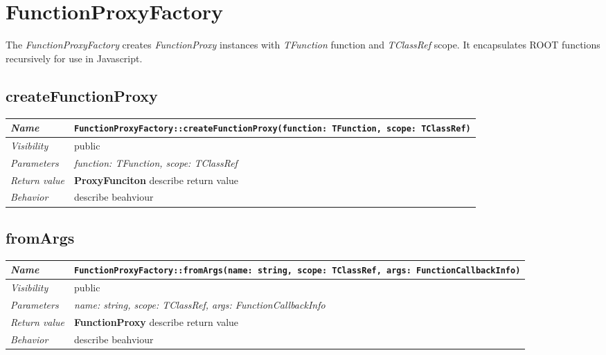 \chapter{FunctionProxyFactory}
The \textit{FunctionProxyFactory} creates \textit{FunctionProxy} instances with \textit{TFunction} function and \textit{TClassRef} scope. It encapsulates ROOT functions recursively for use in Javascript. 
\section{createFunctionProxy}
\begin{longtable}{p{3cm} @{\hskip 1cm} p{12cm}}
 \hline
\textit{Name} & \texttt{FunctionProxyFactory::createFunctionProxy(function: TFunction, scope: TClassRef)}\\
\hline
 \textit{Visibility} & public\\
\hline
\textit{Parameters} & \textit{function: TFunction, scope: TClassRef}\\
\hline
\textit{Return value} & \textbf{ ProxyFunciton} describe return value\\
  \hline
 \textit{Behavior} & describe beahviour \\
\hline
\end{longtable} \pagebreak
 \section{fromArgs}
\begin{longtable}{p{3cm} @{\hskip 1cm} p{12cm}}
 \hline
\textit{Name} & \texttt{FunctionProxyFactory::fromArgs(name: string, scope: TClassRef, args: FunctionCallbackInfo)}\\
\hline
 \textit{Visibility} & public\\
\hline
\textit{Parameters} & \textit{name: string, scope: TClassRef, args: FunctionCallbackInfo}\\
\hline
\textit{Return value} & \textbf{ FunctionProxy} describe return value\\
  \hline
 \textit{Behavior} & describe beahviour \\
\hline
\end{longtable} \pagebreak
 